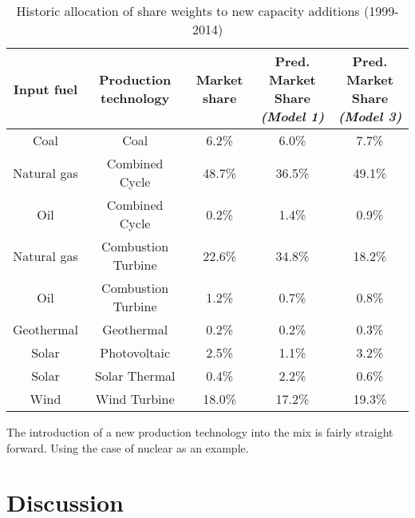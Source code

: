 \documentclass[10pt]{amsart}
\begin{document}
\begin{table}[H]
\caption{Historic allocation of share weights to new capacity additions (1999-2014)}
\centering
\begin{tabular}{c c c c c}
\hline
\hline
Input fuel & Production technology & Market share & \makecell{Pred. Market Share \\ {\footnotesize\textit{(Model 1)}}} & \makecell{Pred. Market Share \\ {\footnotesize\textit{(Model 3)}}} \\ [0.5ex]
\hline
Coal & Coal & 6.2\% & 6.0\% &7.7\% \\
Natural gas & Combined Cycle & 48.7\% & 36.5\% & 49.1\% \\
Oil & Combined Cycle & 0.2\% & 1.4\% & 0.9\% \\
Natural gas & Combustion Turbine & 22.6\% & 34.8\% & 18.2\%\\
Oil & Combustion Turbine & 1.2\% & 0.7\% & 0.8\% \\
Geothermal & Geothermal & 0.2\% & 0.2\% & 0.3\% \\
Solar & Photovoltaic & 2.5\% & 1.1\% & 3.2\%\\
Solar & Solar Thermal & 0.4\% & 2.2\% & 0.6\%\\
Wind & Wind Turbine & 18.0\% & 17.2\% & 19.3\% \\ [1ex]
\hline
\end{tabular}
\label{table:perc}
\end{table}

The introduction of a new production technology into the mix is fairly straight forward. 
Using the case of nuclear as an example.


\section{Discussion}



\newpage
{}
\begin{landscape}
\end{landscape}
\restoregeometry



\newpage
\printbibliography
\end{document}

